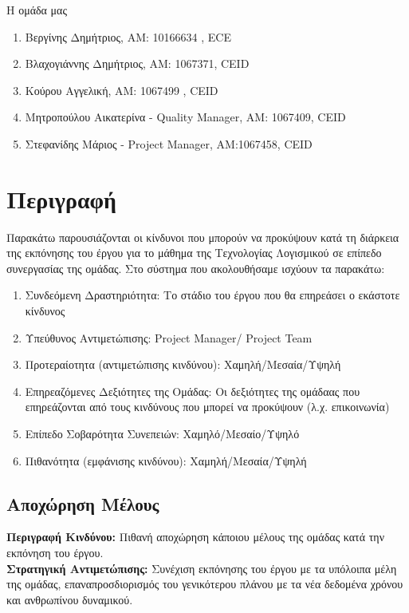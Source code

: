 \documentclass{article}
\begin{document}
\noindent Η ομάδα μας

\begin{enumerate}
  \item Βεργίνης Δημήτριος, ΑΜ: 10166634 , ECE
  \item Βλαχογιάννης Δημήτριος, ΑΜ: 1067371, CEID
  \item Κούρου Αγγελική, ΑΜ: 1067499 , CEID
  \item Μητροπούλου Αικατερίνα - Quality Manager, ΑΜ: 1067409, CEID
  \item Στεφανίδης Μάριος - Project Manager, ΑΜ:1067458, CEID
\end{enumerate}

{
  \hypersetup{linkcolor=black}
  \tableofcontents
}

\section{Περιγραφή}

Παρακάτω παρουσιάζονται οι κίνδυνοι που μπορούν να προκύψουν κατά τη διάρκεια της εκπόνησης του έργου για το μάθημα της Τεχνολογίας Λογισμικού σε επίπεδο συνεργασίας της ομάδας. Στο σύστημα που ακολουθήσαμε ισχύουν τα παρακάτω:
\begin{enumerate}
    \item Συνδεόμενη Δραστηριότητα: Το στάδιο του έργου που θα επηρεάσει ο εκάστοτε κίνδυνος
    \item Υπεύθυνος Αντιμετώπισης: Project Manager/ Project Team
    \item Προτεραίοτητα (αντιμετώπισης κινδύνου): Χαμηλή/Μεσαία/Υψηλή
    \item Επηρεαζόμενες Δεξιότητες της Ομάδας: Οι δεξιότητες της ομάδαας που επηρεάζονται από τους κινδύνους που μπορεί  να προκύψουν (λ.χ. επικοινωνία) 
    \item Επίπεδο Σοβαρότητα Συνεπειών: Χαμηλό/Μεσαίο/Υψηλό
    \item Πιθανότητα (εμφάνισης κινδύνου): Χαμηλή/Μεσαία/Υψηλή
\end{enumerate}

\subsection{Αποχώρηση Μέλους}

\textbf{Περιγραφή Κινδύνου:} Πιθανή αποχώρηση κάποιου μέλους της ομάδας κατά την εκπόνηση του έργου. \\

\textbf{Στρατηγική Αντιμετώπισης:}  Συνέχιση εκπόνησης του έργου με τα  υπόλοιπα μέλη της ομάδας, επαναπροσδιορισμός του γενικότερου πλάνου με τα νέα δεδομένα χρόνου και ανθρωπίνου δυναμικού.
 
\end{document}
